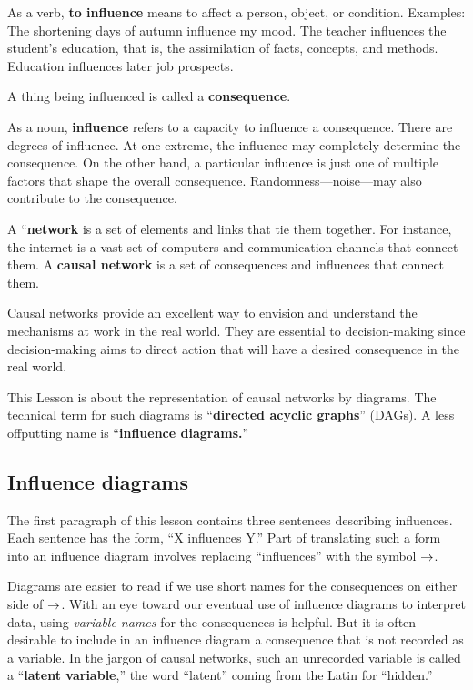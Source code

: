 \documentclass[
  letterpaper,
  DIV=11,
  numbers=noendperiod,
  oneside]{scrartcl}
\begin{document}
As a verb, \textbf{to influence} means to affect a person, object, or
condition. Examples: The shortening days of autumn influence my mood.
The teacher influences the student's education, that is, the
assimilation of facts, concepts, and methods. Education influences later
job prospects.

A thing being influenced is called a \textbf{consequence}.

As a noun, \textbf{influence} refers to a capacity to influence a
consequence. There are degrees of influence. At one extreme, the
influence may completely determine the consequence. On the other hand, a
particular influence is just one of multiple factors that shape the
overall consequence. Randomness---noise---may also contribute to the
consequence.

A ``\textbf{network} is a set of elements and links that tie them
together. For instance, the internet is a vast set of computers and
communication channels that connect them. A \textbf{causal network} is a
set of consequences and influences that connect them.

Causal networks provide an excellent way to envision and understand the
mechanisms at work in the real world. They are essential to
decision-making since decision-making aims to direct action that will
have a desired consequence in the real world.

This Lesson is about the representation of causal networks by diagrams.
The technical term for such diagrams is ``\textbf{directed acyclic
graphs}'' (DAGs). A less offputting name is ``\textbf{influence
diagrams.}''

\subsection{Influence diagrams}\label{influence-diagrams}

The first paragraph of this lesson contains three sentences describing
influences. Each sentence has the form, ``X influences Y.'' Part of
translating such a form into an influence diagram involves replacing
``influences'' with the symbol \(\Large\rightarrow\).

Diagrams are easier to read if we use short names for the consequences
on either side of \(\Large\rightarrow\). With an eye toward our eventual
use of influence diagrams to interpret data, using \emph{variable names}
for the consequences is helpful. But it is often desirable to include in
an influence diagram a consequence that is not recorded as a variable.
In the jargon of causal networks, such an unrecorded variable is called
a ``\textbf{latent variable},'' the word ``latent'' coming from the
Latin for ``hidden.''
\end{document}
